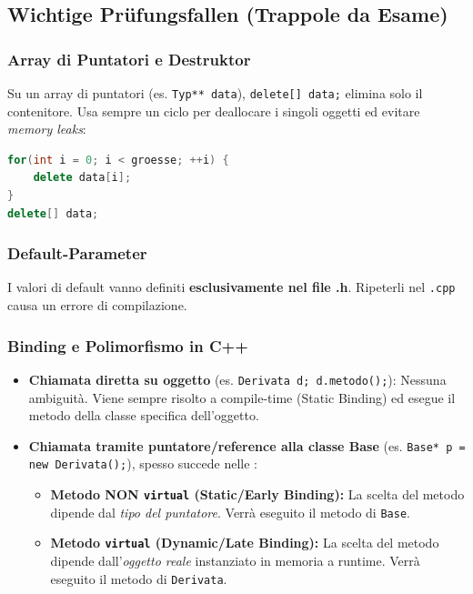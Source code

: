 \subsection{Wichtige Prüfungsfallen (Trappole da Esame)}

\subsubsection{Array di Puntatori e Destruktor}
Su un array di puntatori (es. \texttt{Typ** data}), \texttt{delete[] data;} elimina solo il contenitore. Usa sempre un ciclo per deallocare i singoli oggetti ed evitare \textit{memory leaks}:
\begin{lstlisting}[language=C++]
for(int i = 0; i < groesse; ++i) { 
    delete data[i]; 
}
delete[] data;
\end{lstlisting}

\subsubsection{Default-Parameter}
I valori di default vanno definiti \textbf{esclusivamente nel file .h}. Ripeterli nel \texttt{.cpp} causa un errore di compilazione.

\subsubsection{Binding e Polimorfismo in C++}
\begin{itemize}
    \item \textbf{Chiamata diretta su oggetto} (es. \texttt{Derivata d; d.metodo();}): Nessuna ambiguità. Viene sempre risolto a compile-time (Static Binding) ed esegue il metodo della classe specifica dell'oggetto.
    \item \textbf{Chiamata tramite puntatore/reference alla classe Base} (es. \texttt{Base* p = new Derivata();}), spesso 
    succede nelle :
    \begin{itemize}
        \item \textbf{Metodo NON \texttt{virtual} (Static/Early Binding):} La scelta del metodo dipende dal \textit{tipo del puntatore}. Verrà eseguito il metodo di \texttt{Base}.
        \item \textbf{Metodo \texttt{virtual} (Dynamic/Late Binding):} La scelta del metodo dipende dall'\textit{oggetto reale} instanziato in memoria a runtime. Verrà eseguito il metodo di \texttt{Derivata}.
    \end{itemize}
\end{itemize}

